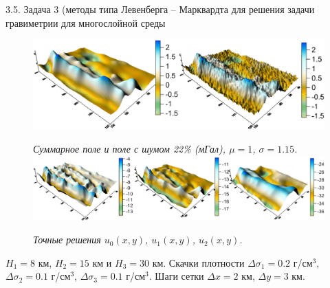 \documentclass[10pt,pdf, mathserif, hyperref={unicode}]{beamer}
\begin{document}
\begin{frame}{\small 3.5. Задача 3 (методы типа Левенберга -- Марквардта для решения задачи гравиметрии для многослойной среды}
	\begin{figure}
		\centering
		\includegraphics[height=0.2\textheight]{fields}
		
		\centering\textit{Суммарное поле и поле с шумом 22\% (мГал), $\mu=1$, $\sigma=1.15$.}
		\centering
		\includegraphics[height=0.2\textheight]{exact_hor}
		
		\centering\textit{Точные решения $u_0(x,y)$, $u_1(x,y)$, $u_2(x,y)$.}
	\end{figure}
	
	$H_1=8$ км, $H_2=15$ км и $H_3=30$ км. Скачки плотности $\Delta\sigma_1=0.2$ г/см$^3$, $\Delta\sigma_2=0.1$ г/см$^3$, $\Delta\sigma_3=0.1$ г/см$^3$. Шаги сетки $\Delta x=2$ км, $\Delta y=3$ км.
	\let\thefootnote\relax\let\thefootnote\relax{}
\end{frame}
\end{document}
